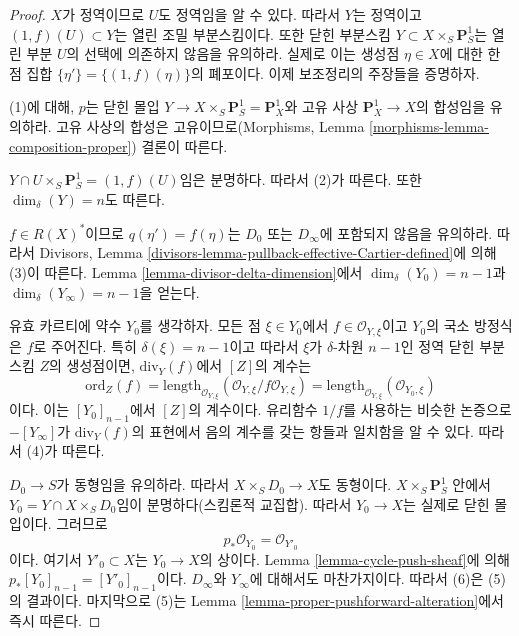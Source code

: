 \begin{proof}
$X$가 정역이므로 $U$도 정역임을 알 수 있다. 따라서 $Y$는 정역이고
$(1, f)(U) \subset Y$는 열린 조밀 부분스킴이다. 또한 닫힌 부분스킴
$Y \subset X \times_S \mathbf{P}^1_S$는 열린 부분 $U$의 선택에
의존하지 않음을 유의하라. 실제로 이는 생성점 $\eta \in X$에 대한
한 점 집합 $\{\eta'\} = \{(1, f)(\eta)\}$의 폐포이다. 이제 보조정리의
주장들을 증명하자.

\medskip\noindent
(1)에 대해, $p$는 닫힌 몰입
$Y \to X \times_S \mathbf{P}^1_S = \mathbf{P}^1_X$와 고유 사상
$\mathbf{P}^1_X \to X$의 합성임을 유의하라. 고유 사상의 합성은
고유이므로(Morphisms, Lemma \ref{morphisms-lemma-composition-proper})
결론이 따른다.

\medskip\noindent
$Y \cap U \times_S \mathbf{P}^1_S = (1, f)(U)$임은 분명하다. 따라서
(2)가 따른다. 또한 $\dim_\delta(Y) = n$도 따른다.

\medskip\noindent
$f \in R(X)^*$이므로 $q(\eta') = f(\eta)$는 $D_0$ 또는 $D_\infty$에
포함되지 않음을 유의하라. 따라서 Divisors, Lemma
\ref{divisors-lemma-pullback-effective-Cartier-defined}에 의해 (3)이
따른다. Lemma \ref{lemma-divisor-delta-dimension}에서
$\dim_\delta(Y_0) = n - 1$과
$\dim_\delta(Y_\infty) = n - 1$을 얻는다.

\medskip\noindent
유효 카르티에 약수 $Y_0$를 생각하자. 모든 점 $\xi \in Y_0$에서
$f \in \mathcal{O}_{Y, \xi}$이고 $Y_0$의 국소 방정식은 $f$로 주어진다.
특히 $\delta(\xi) = n - 1$이고 따라서 $\xi$가 $\delta$-차원
$n - 1$인 정역 닫힌 부분스킴 $Z$의 생성점이면,
$\text{div}_Y(f)$에서 $[Z]$의 계수는
$$
\text{ord}_Z(f) =
\text{length}_{\mathcal{O}_{Y, \xi}}
(\mathcal{O}_{Y, \xi}/f\mathcal{O}_{Y, \xi}) =
\text{length}_{\mathcal{O}_{Y, \xi}}
(\mathcal{O}_{Y_0, \xi})
$$
이다. 이는 $[Y_0]_{n - 1}$에서 $[Z]$의 계수이다. 유리함수 $1/f$를
사용하는 비슷한 논증으로 $-[Y_\infty]$가 $\text{div}_Y(f)$의 표현에서
음의 계수를 갖는 항들과 일치함을 알 수 있다. 따라서 (4)가 따른다.

\medskip\noindent
$D_0 \to S$가 동형임을 유의하라. 따라서
$X \times_S D_0 \to X$도 동형이다. $X \times_S \mathbf{P}^1_S$ 안에서
$Y_0 = Y \cap X \times_S D_0$임이 분명하다(스킴론적 교집합).
따라서 $Y_0 \to X$는 실제로 닫힌 몰입이다. 그러므로
$$
p_*\mathcal{O}_{Y_0} = \mathcal{O}_{Y'_0}
$$
이다. 여기서 $Y'_0 \subset X$는 $Y_0 \to X$의 상이다. Lemma
\ref{lemma-cycle-push-sheaf}에 의해
$p_*[Y_0]_{n - 1} = [Y'_0]_{n - 1}$이다. $D_\infty$와 $Y_\infty$에
대해서도 마찬가지이다. 따라서 (6)은 (5)의 결과이다. 마지막으로 (5)는
Lemma \ref{lemma-proper-pushforward-alteration}에서 즉시 따른다.
\end{proof}

